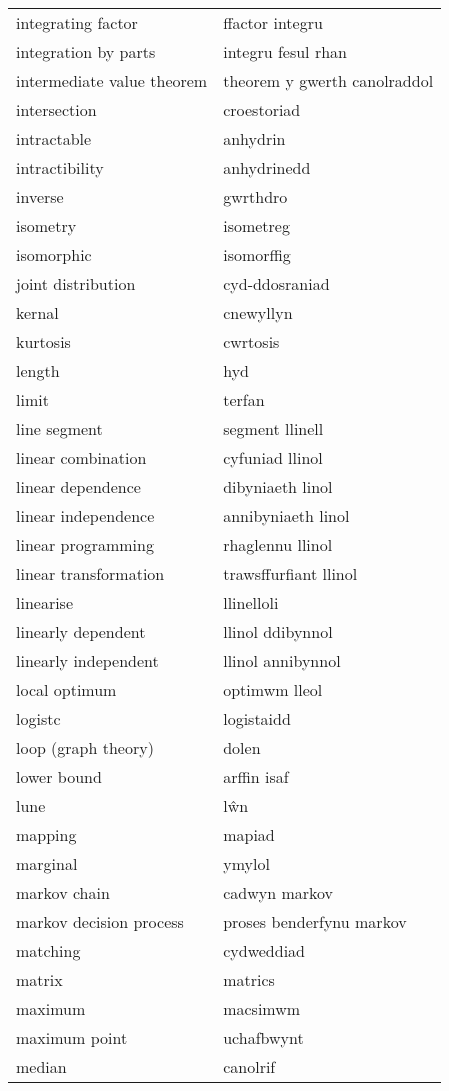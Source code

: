 \begin{supertabular}{p{0.22\textwidth}p{0.22\textwidth}}
integrating factor & ffactor integru \\
integration by parts & integru fesul rhan \\
intermediate value theorem & theorem y gwerth canolraddol \\
intersection & croestoriad \\
intractable & anhydrin \\
intractibility & anhydrinedd \\
inverse & gwrthdro \\
isometry & isometreg \\
isomorphic & isomorffig \\
joint distribution & cyd-ddosraniad \\
kernal & cnewyllyn \\
kurtosis & cwrtosis \\
length & hyd \\
limit & terfan \\
line segment & segment llinell \\
linear combination & cyfuniad llinol \\
linear dependence & dibyniaeth linol \\
linear independence & annibyniaeth linol \\
linear programming & rhaglennu llinol \\
linear transformation & trawsffurfiant llinol \\
linearise & llinelloli \\
linearly dependent & llinol ddibynnol \\
linearly independent & llinol annibynnol \\
local optimum & optimwm lleol \\
logistc & logistaidd \\
loop (graph theory) & dolen \\
lower bound & arffin isaf \\
lune & lŵn \\
mapping & mapiad \\
marginal & ymylol \\
markov chain & cadwyn markov \\
markov decision process & proses benderfynu markov \\
matching & cydweddiad \\
matrix & matrics \\
maximum & macsimwm \\
maximum point & uchafbwynt \\
median & canolrif \\

\end{supertabular}
